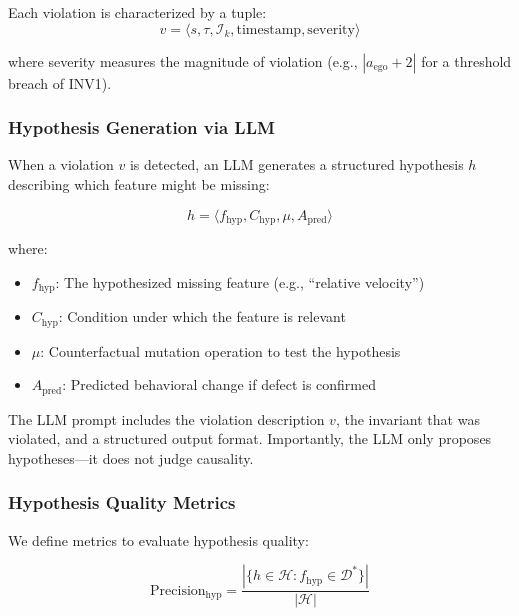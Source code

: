 \documentclass[conference]{IEEEtran}
\theoremstyle{plain}
\begin{document}
Each violation is characterized by a tuple:
\begin{equation}
v = \langle s, \tau, \mathcal{I}_k, \text{timestamp}, \text{severity} \rangle
\label{eq:violation}
\end{equation}

where severity measures the magnitude of violation (e.g., $|a_{\text{ego}} + 2|$ for a threshold breach of INV1).

\subsubsection{Hypothesis Generation via LLM}

When a violation $v$ is detected, an LLM generates a structured hypothesis $h$ describing which feature might be missing:

\begin{equation}
h = \langle f_{\text{hyp}}, C_{\text{hyp}}, \mu, A_{\text{pred}} \rangle
\label{eq:hypothesis}
\end{equation}

where:
\begin{itemize}[nosep]
    \item $f_{\text{hyp}}$: The hypothesized missing feature (e.g., ``relative velocity'')
    \item $C_{\text{hyp}}$: Condition under which the feature is relevant
    \item $\mu$: Counterfactual mutation operation to test the hypothesis
    \item $A_{\text{pred}}$: Predicted behavioral change if defect is confirmed
\end{itemize}

The LLM prompt includes the violation description $v$, the invariant that was violated, and a structured output format. Importantly, the LLM only proposes hypotheses---it does not judge causality.

\subsubsection{Hypothesis Quality Metrics}

We define metrics to evaluate hypothesis quality:

\begin{equation}
\text{Precision}_{\text{hyp}} = \frac{|\{h \in \mathcal{H}: f_{\text{hyp}} \in \mathcal{D}^*\}|}{|\mathcal{H}|}
\label{eq:hyp_precision}
\end{equation}
\end{document}
